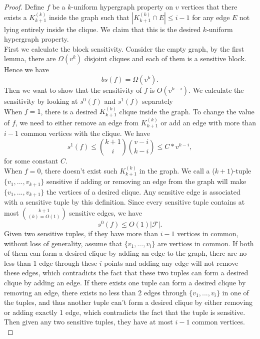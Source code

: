 \documentclass[psamsfonts]{amsart}
\theoremstyle{definition}
\theoremstyle{remark}
\numberwithin{equation}{section}
\begin{document}
	\begin{proof}
		Define $f$ be a $k$-uniform hypergraph property on $v$ vertices that there exists a $K_{k+1}^{(k)}$ inside the graph such that $|K_{k+1}^{(k)} \cap E| \leq  i-1$ for any edge $E$ not lying entirely inside the clique. We claim that this is the desired $k$-uniform hypergraph property.\\
		\indent First we calculate the block sensitivity. Consider the empty graph, by the first lemma, there are $\Omega (v^k)$ disjoint cliques and each of them is a sensitive block. Hence we have 
		\begin{equation}
			bs(f) = \Omega (v^k).
		\end{equation}
		\indent Then we want to show that the sensitivity of $f$ is $O(v^{k-i})$. We calculate the sensitivity by looking at $s^0(f)$ and $s^1(f)$ separately\\
		\indent When $f=1$, there is a desired $K_{k+1}^{(k)}$ clique inside the graph. To change the value of $f$, we need to either remove an edge from $K_{k+1}^{(k)}$ or add an edge with more than $i-1$ common vertices with the clique. We have
		\begin{equation}
			s^1(f) \leq {k+1 \choose{i}}{v-i \choose{k-i}} \leq C*v^{k-i},
		\end{equation}
		for some constant $C$.\\
		\indent When $f=0$, there doesn't exist such $K_{k+1}^{(k)}$ in the graph. We call a ($k+1$)-tuple $\{v_1,...,v_{k+1}\}$ sensitive if adding or removing an edge from the graph will make $\{v_1,...,v_{k+1}\}$ the vertices of a desired clique. Any sensitive edge is associated with a sensitive tuple by this definition. Since every sensitive tuple contains at most $k+1 \choose(k) = O(1)$ sensitive edges, we have
		\begin{equation}
			s^0(f) \leq O(1) |\mathcal{F}|.
		\end{equation}
		\indent Given two sensitive tuples, if they have more than $i-1$ vertices in common, without loss of generality, assume that $\{v_1,...,v_i\}$ are vertices in common. If both of them can form a desired clique by adding an edge to the graph, there are no less than 1 edge through these $i$ points and adding any edge will not remove these edges, which contradicts the fact that these two tuples can form a desired clique by adding an edge. If there exists one tuple can form a desired clique by removing an edge, there exists no less than 2 edges through $\{v_1,...,v_i\}$ in one of the tuples, and thus another tuple can't form a desired clique by either removing or adding exactly 1 edge, which contradicts the fact that the tuple is sensitive. Then given any two sensitive tuples, they have at most $i-1$ common vertices.\\

\end{proof}
\end{document}
